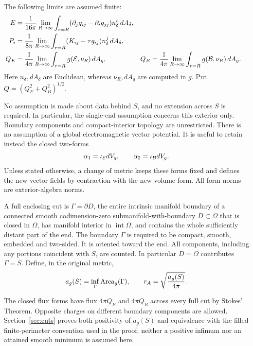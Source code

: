 \begin{definition}
The following limits are assumed finite:
\begin{align}
 E&=\frac1{16\pi}\lim_{R\to\infty}
 \int_{r=R}(\partial_jg_{ij}-\partial_ig_{jj})n_\delta^i\,dA_\delta,
 \label{eq:adm-energy}\\
 P_i&=\frac1{8\pi}\lim_{R\to\infty}
 \int_{r=R}(K_{ij}-\tau g_{ij})n_\delta^j\,dA_\delta,
 \label{eq:adm-momentum}\\
 Q_E&=\frac1{4\pi}\lim_{R\to\infty}
 \int_{r=R}g(\mathcal E,\nu_R)\,dA_g,
 &Q_B&=\frac1{4\pi}\lim_{R\to\infty}
 \int_{r=R}g(\mathcal B,\nu_R)\,dA_g.
 \label{eq:charges}
\end{align}
Here $n_\delta,dA_\delta$ are Euclidean, whereas $\nu_R,dA_g$ are
computed in $g$. Put $Q=(Q_E^2+Q_B^2)^{1/2}$.
\end{definition}

No assumption is made about data behind $S$, and no extension across $S$
is required. In particular, the single-end assumption concerns this
exterior only. Boundary components and compact-interior topology are
unrestricted. There is no assumption of a global electromagnetic vector
potential. It is useful to retain instead the closed two-forms
\begin{equation}\label{eq:flux-forms}
 \alpha_1=\iota_{\mathcal E}dV_g,\qquad
 \alpha_2=\iota_{\mathcal B}dV_g.
\end{equation}
Unless stated otherwise, a change of metric keeps these forms fixed and
defines the new vector fields by contraction with the new volume form.
All form norms are exterior-algebra norms.

\begin{definition}\label{def:full-cut}
A full enclosing cut is $\Gamma=\partial D$, the entire intrinsic
manifold boundary of a connected smooth codimension-zero
submanifold-with-boundary $D\subset\Omega$ that is closed in $\Omega$,
has manifold interior in $\operatorname{int}\Omega$, and contains the
whole sufficiently distant part of the end. The boundary $\Gamma$ is
required to be compact, smooth, embedded and two-sided. It is oriented
toward the end. All components, including any portions coincident with
$S$, are counted. In particular $D=\Omega$ contributes $\Gamma=S$.
Define, in the original metric,
\begin{equation}\label{eq:enclosing-area}
 a_g(S)=\inf_\Gamma\operatorname{Area}_g(\Gamma),\qquad
 r_A=\sqrt{\frac{a_g(S)}{4\pi}}.
\end{equation}
\end{definition}

The closed flux forms have flux $4\pi Q_E$ and $4\pi Q_B$ across every
full cut by Stokes' Theorem. Opposite charges on different boundary
components are allowed. Section~\ref{sec:cuts} proves both positivity of
$a_g(S)$ and equivalence with the filled finite-perimeter convention used
in the proof; neither a positive infimum nor an attained smooth minimum
is assumed here.

